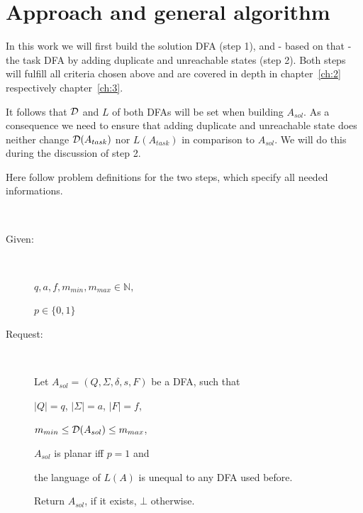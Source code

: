 \section{Approach and general algorithm}

In this work we will first build the solution DFA (step 1), and - based on that - the task DFA by adding duplicate and unreachable states (step 2). Both steps will fulfill all criteria chosen above and are covered in depth in chapter~\ref{ch:2} respectively chapter~\ref{ch:3}.

It follows that $\mathcal{D}$ and $L$ of both DFAs will be set when building $A_{sol}$. As a consequence we need to ensure that adding duplicate and unreachable state does neither change $\mathcal{D}(A_{task})$ nor $L(A_{task})$ in comparison to $A_{sol}$. We will do this during the discussion of step 2.

Here follow problem definitions for the two steps, which specify all needed informations.  %

\begin{definition}[BuildNewMinimalDFA] \label{ch:1:def:BuildNewMinimalDFA} $ $
	\begin{description}
		
		\item[Given:] $ $
		
		$q, a, f, m_{min}, m_{max} \in \mathbb{N},$
		
		$p \in \{0,1\}$
		\item[Request:] $ $
		
		Let $A_{sol} = (Q, \Sigma, \delta, s, F)$ be a DFA, such that
		
		\qquad $|Q|=q$, $|\Sigma|=a$, $|F|=f$,
		
		\qquad $m_{min} \le \mathcal{D}(A_{sol}) \le m_{max}$,
		
		\qquad $A_{sol}$ is planar iff $p = 1$ and
		
		\qquad the language of $L(A)$ is unequal to any DFA used before.
		
		Return $A_{sol}$, if it exists, $\bot$ otherwise.
	\end{description}
\end{definition}

